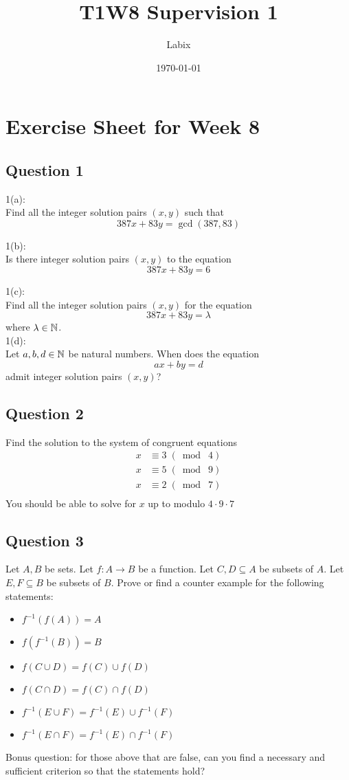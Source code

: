 \documentclass[a4paper]{article}
\title{T1W8 Supervision 1}
\author{Labix}
\date{\today}
\begin{document}
\section*{Exercise Sheet for Week 8}
\subsection*{Question 1}
1(a): \\
Find all the integer solution pairs $(x,y)$ such that $$387x+83y=\gcd(387,83)$$

1(b): \\
Is there integer solution pairs $(x,y)$ to the equation $$387x+83y=6$$

1(c): \\
Find all the integer solution pairs $(x,y)$ for the equation $$387x+83y=\lambda$$ where $\lambda\in\mathbb{N}$. \\

1(d): \\
Let $a,b,d\in\mathbb{N}$ be natural numbers. When does the equation $$ax+by=d$$ admit integer solution pairs $(x,y)$?

\subsection*{Question 2}
Find the solution to the system of congruent equations 
\begin{align*}
x&\equiv 3\;(\bmod\;4)\\
x&\equiv 5\;(\bmod\;9)\\
x&\equiv 2\;(\bmod\;7)\\
\end{align*}
You should be able to solve for $x$ up to modulo $4\cdot 9\cdot 7$

\subsection*{Question 3}
Let $A,B$ be sets. Let $f:A\to B$ be a function. Let $C,D\subseteq A$ be subsets of $A$. Let $E,F\subseteq B$ be subsets of $B$. Prove or find a counter example for the following statements: 
\begin{itemize}
\item $f^{-1}(f(A))=A$
\item $f(f^{-1}(B))=B$
\item $f(C\cup D)=f(C)\cup f(D)$
\item $f(C\cap D)=f(C)\cap f(D)$
\item $f^{-1}(E\cup F)=f^{-1}(E)\cup f^{-1}(F)$
\item $f^{-1}(E\cap F)=f^{-1}(E)\cap f^{-1}(F)$
\end{itemize}
Bonus question: for those above that are false, can you find a necessary and sufficient criterion so that the statements hold?
\end{document}
